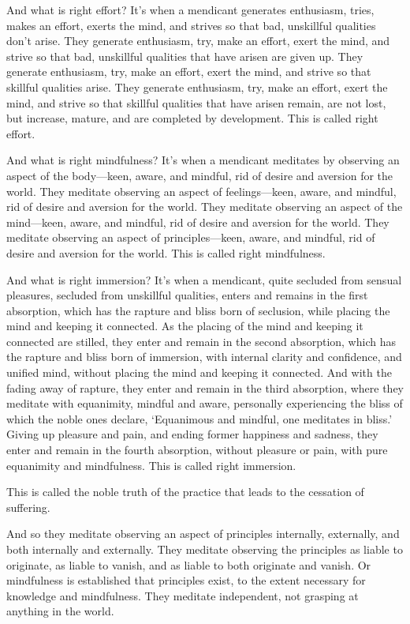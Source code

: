 \documentclass[12pt,openany]{book}%
\begin{document}
And what is right effort? It’s when a mendicant generates enthusiasm, tries, makes an effort, exerts the mind, and strives so that bad, unskillful qualities don’t arise. They generate enthusiasm, try, make an effort, exert the mind, and strive so that bad, unskillful qualities that have arisen are given up. They generate enthusiasm, try, make an effort, exert the mind, and strive so that skillful qualities arise. They generate enthusiasm, try, make an effort, exert the mind, and strive so that skillful qualities that have arisen remain, are not lost, but increase, mature, and are completed by development. This is called right effort. 

And what is right mindfulness? It’s when a mendicant meditates by observing an aspect of the body—keen, aware, and mindful, rid of desire and aversion for the world. They meditate observing an aspect of feelings—keen, aware, and mindful, rid of desire and aversion for the world. They meditate observing an aspect of the mind—keen, aware, and mindful, rid of desire and aversion for the world. They meditate observing an aspect of principles—keen, aware, and mindful, rid of desire and aversion for the world. This is called right mindfulness. 

And what is right immersion? It’s when a mendicant, quite secluded from sensual pleasures, secluded from unskillful qualities, enters and remains in the first absorption, which has the rapture and bliss born of seclusion, while placing the mind and keeping it connected. As the placing of the mind and keeping it connected are stilled, they enter and remain in the second absorption, which has the rapture and bliss born of immersion, with internal clarity and confidence, and unified mind, without placing the mind and keeping it connected. And with the fading away of rapture, they enter and remain in the third absorption, where they meditate with equanimity, mindful and aware, personally experiencing the bliss of which the noble ones declare, ‘Equanimous and mindful, one meditates in bliss.’ Giving up pleasure and pain, and ending former happiness and sadness, they enter and remain in the fourth absorption, without pleasure or pain, with pure equanimity and mindfulness. This is called right immersion. 

This is called the noble truth of the practice that leads to the cessation of suffering. 

And so they meditate observing an aspect of principles internally, externally, and both internally and externally. They meditate observing the principles as liable to originate, as liable to vanish, and as liable to both originate and vanish. Or mindfulness is established that principles exist, to the extent necessary for knowledge and mindfulness. They meditate independent, not grasping at anything in the world. 
\end{document}
